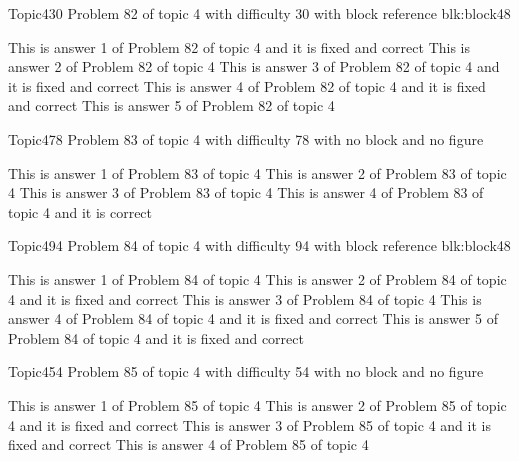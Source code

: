 \documentclass[master]{exam}
\begin{document}
\begin{problem}[requires=blk:block48]{Topic4}{30}
	Problem 82 of topic 4 with difficulty 30 with block reference blk:block48
	\begin{answers}
		 This is answer 1 of Problem 82 of topic 4 and it is fixed and correct
		\answer This is answer 2 of Problem 82 of topic 4 
		 This is answer 3 of Problem 82 of topic 4 and it is fixed and correct
		 This is answer 4 of Problem 82 of topic 4 and it is fixed and correct
		\answer This is answer 5 of Problem 82 of topic 4 
	\end{answers}
\end{problem}

\begin{problem}{Topic4}{78}
	Problem 83 of topic 4 with difficulty 78 with no block and no figure
	\begin{answers}
		\answer This is answer 1 of Problem 83 of topic 4 
		\answer This is answer 2 of Problem 83 of topic 4 
		\answer This is answer 3 of Problem 83 of topic 4 
		\answer[correct] This is answer 4 of Problem 83 of topic 4 and it is correct
	\end{answers}
\end{problem}

\begin{problem}[requires=blk:block48]{Topic4}{94}
	Problem 84 of topic 4 with difficulty 94 with block reference blk:block48
	\begin{answers}
		\answer This is answer 1 of Problem 84 of topic 4 
		 This is answer 2 of Problem 84 of topic 4 and it is fixed and correct
		\answer This is answer 3 of Problem 84 of topic 4 
		 This is answer 4 of Problem 84 of topic 4 and it is fixed and correct
		 This is answer 5 of Problem 84 of topic 4 and it is fixed and correct
	\end{answers}
\end{problem}

\begin{problem}{Topic4}{54}
	Problem 85 of topic 4 with difficulty 54 with no block and no figure
	\begin{answers}
		\answer This is answer 1 of Problem 85 of topic 4 
		 This is answer 2 of Problem 85 of topic 4 and it is fixed and correct
		 This is answer 3 of Problem 85 of topic 4 and it is fixed and correct
		\answer This is answer 4 of Problem 85 of topic 4 
	\end{answers}
\end{problem}
\end{document}
